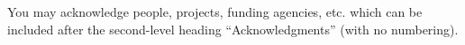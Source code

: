 \documentclass{article}
\newenvironment{ExprCode}		{\vspace{-2mm} \small\verbatim}{\endverbatim\vspace{-2mm}}
\begin{document}
\begin{acknowledgments}
You may acknowledge people, projects, 
funding agencies, etc. 
which can be included after the second-level heading
``Acknowledgments'' (with no numbering).
\end{acknowledgments} 



%               
%      
\end{document}
